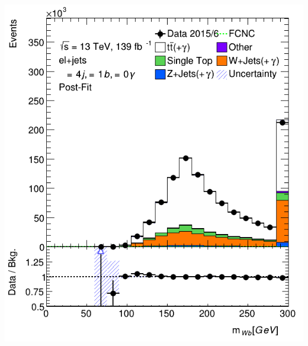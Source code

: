 \documentclass[10pt]{beamer}
\begin{document}
{\begin{columns}
\begin{column}{0.5\textwidth}
\includegraphics[width=.8\textwidth]{../../Thesis/ThesisImages/RegionPlots/AfterScaling/ControlRegions/HardCodedNormFactor/FCNC_All_ejets/Plots/VR3_SMtop_postFit.png}
\end{column}
\end{columns}
}
\end{document}
